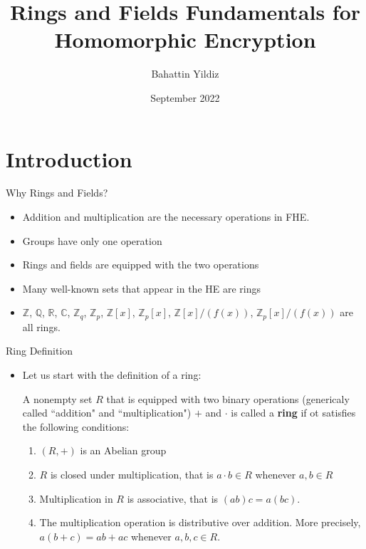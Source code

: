 \documentclass[ %
 10pt, xcolor={dvipsnames,svgnames,x11names,hyperref},
   hyperref={colorlinks=true,citecolor=green,linkcolor=DarkRed,urlcolor=ProcessBlue,anchorcolor=blue}
  ]{beamer}
\newenvironment{stepitemize}{\begin{itemize}[<+->]}{\end{itemize} }
\newcommand{\Z}{\mathbb{Z}}
\newcommand{\Q}{\mathbb{Q}}
\newcommand{\R}{\mathbb{R}}
\newcommand{\C}{\mathbb{C}}
\begin{document}
\title[Rings and Fields Fundamentals]{
Rings and Fields Fundamentals for Homomorphic Encryption}
\author{Bahattin Yildiz}
\date[September]{September 2022}
\maketitle

\section{Introduction}

\begin{frame}{Why Rings and Fields?}
\begin{stepitemize}
    \item Addition and multiplication are the necessary operations in FHE. 
    \item Groups have only one operation
    \item Rings and fields are equipped with the two operations
    \item Many well-known sets that appear in the HE are rings
    \item $\Z$, $\Q$, $\R$, $\C$, $\Z_q$, $\Z_p$, $\Z[x]$, $\Z_p[x]$, $\Z[x]/(f(x))$, $\Z_p[x]/(f(x))$ are all rings. 
\end{stepitemize}
\end{frame}

\begin{frame}{Ring Definition}
\begin{stepitemize}
\item Let us start with the definition of a ring:
\begin{definition}
A nonempty set $R$ that is equipped with two binary operations (genericaly called ``addition" and ``multiplication") $+$ and $\cdot$ is called a {\bf ring} if ot satisfies the following conditions:
\begin{enumerate}
    \item $(R,+)$ is an Abelian group
 \item $R$ is closed under multiplication, that is $a\cdot b \in R$ whenever $a,b\in R$
 \item Multiplication in $R$ is associative, that is $(ab)c=a(bc)$.
 \item The multiplication operation is distributive over addition. More precisely, $a(b+c)=ab+ac$ whenever $a, b, c \in R$.
\end{enumerate}
\end{definition}
\end{stepitemize}

\end{frame}
\end{document}
